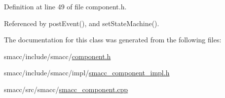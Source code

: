 Definition at line 49 of file component.\+h.



Referenced by post\+Event(), and set\+State\+Machine().



The documentation for this class was generated from the following files\+:\begin{DoxyCompactItemize}
\item 
smacc/include/smacc/\hyperlink{component_8h}{component.\+h}\item 
smacc/include/smacc/impl/\hyperlink{smacc__component__impl_8h}{smacc\+\_\+component\+\_\+impl.\+h}\item 
smacc/src/smacc/\hyperlink{smacc__component_8cpp}{smacc\+\_\+component.\+cpp}\end{DoxyCompactItemize}
